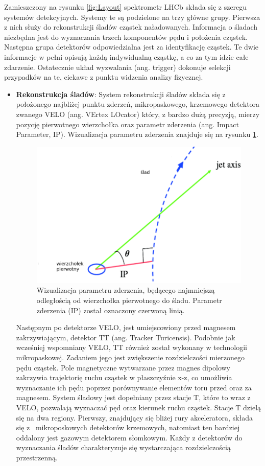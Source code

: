 Zamieszczony na rysunku \ref{fig:Layout} spektrometr LHCb składa się z szeregu systemów detekcyjnych. Systemy te są podzielone na trzy główne grupy. Pierwsza z nich służy do  rekonstrukcji śladów cząstek naładowanych. Informacja o śladach niezbędna jest do wyznaczania trzech komponentów pędu i położenia cząstek. Następna grupa detektorów odpowiedzialna jest za identyfikację cząstek. Te dwie informacje w pełni opisują każdą indywidualną cząstkę, a co za tym idzie całe zdarzenie. Ostatecznie układ wyzwalania (ang. trigger) dokonuje selekcji przypadków na te, ciekawe z punktu widzenia analizy fizycznej. 
\begin{itemize}
\item \textbf{Rekonstrukcja śladów}: System rekonstrukcji śladów składa się z położonego najbliżej punktu zderzeń, mikropaskowego, krzemowego detektora zwanego VELO (ang. VErtex LOcator) który, z  bardzo dużą precyzją,   mierzy pozycję pierwotnego wierzchołka oraz parametr zderzenia (ang. Impact Parameter, IP). Wizualizacja parametru zderzenia znajduje się na rysunku \ref{fig:IP}.
\begin{figure}[th] 
  \centering
  \includegraphics[scale=0.5]{rozdzial2/impactParameter.png}
  \caption{Wizualizacja parametru zderzenia, będącego najmniejszą odległością od wierzchołka pierwotnego do śladu. Parametr zderzenia (IP) został oznaczony czerwoną linią. }
  \label{fig:IP}
\end{figure}

Następnym po detektorze VELO, jest umiejscowiony przed magnesem zakrzywiającym, detektor TT  (ang. Tracker Turicensis). Podobnie jak wcześniej wspomniany VELO, TT również został wykonany w technologii mikropaskowej. Zadaniem jego jest zwiększenie rozdzielczości mierzonego pędu cząstek. Pole magnetyczne wytwarzane przez magnes dipolowy zakrzywia trajektorię ruchu cząstek w płaszczyźnie x-z, co umożliwia wyznaczanie ich pędu poprzez porównywanie elementów toru przed oraz za magnesem. System śladowy jest dopełniany przez stacje T, które to wraz z VELO, pozwalają wyznaczać pęd oraz kierunek ruchu cząstek. Stacje T dzielą się na dwa regiony. Pierwszy, znajdujący się bliżej rury akceleratora, składa się z~ mikroposkowych detektorów krzemowych, natomiast ten bardziej oddalony jest  gazowym detektorem słomkowym.
Każdy z detektorów do wyznaczania śladów charakteryzuje się wystarczająca rozdzielczością przestrzenną. 


\end{itemize}
